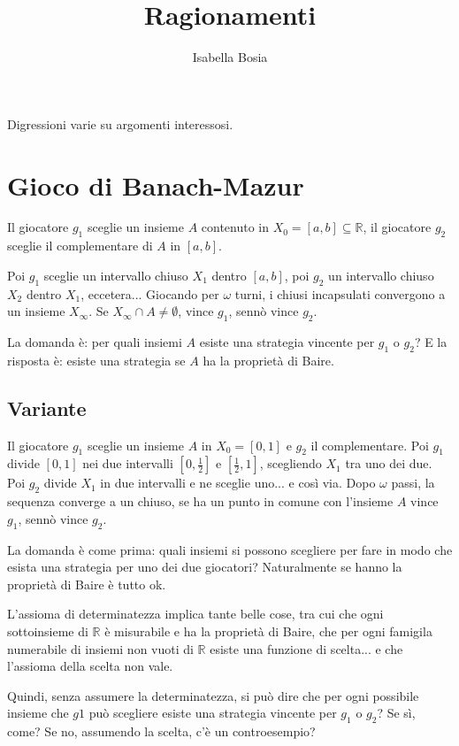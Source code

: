 \documentclass[10pt]{article}
\title{Ragionamenti}
\author{Isabella Bosia}
\date{}
\theoremstyle{definition}
\begin{document}
\maketitle

Digressioni varie su argomenti interessosi.

\section{Gioco di Banach-Mazur}

Il giocatore $g_1$ sceglie un insieme $A$ contenuto in $X_0=[a,b]\subseteq\mathbb R$, il giocatore $g_2$ sceglie il complementare di $A$ in $[a,b]$.

Poi $g_1$ sceglie un intervallo chiuso $X_1$ dentro $[a,b]$, poi $g_2$ un intervallo chiuso $X_2$ dentro $X_1$, eccetera...
Giocando per $\omega$ turni, i chiusi incapsulati convergono a un insieme $X_\infty$. Se $X_\infty\cap A\neq\emptyset$, vince $g_1$, sennò vince $g_2$.

La domanda è: per quali insiemi $A$ esiste una strategia vincente per $g_1$ o $g_2$?
E la risposta è: esiste una strategia se $A$ ha la proprietà di Baire.

\subsection{Variante}

Il giocatore $g_1$ sceglie un insieme $A$ in $X_0=[0,1]$ e $g_2$ il complementare.
Poi $g_1$ divide $[0,1]$ nei due intervalli $\left[0,\frac12\right]$ e $\left[\frac12,1\right]$, scegliendo $X_1$ tra uno dei due.
Poi $g_2$ divide $X_1$ in due intervalli e ne sceglie uno... e così via.
Dopo $\omega$ passi, la sequenza converge a un chiuso, se ha un punto in comune con l'insieme $A$ vince $g_1$, sennò vince $g_2$.

La domanda è come prima: quali insiemi si possono scegliere per fare in modo che esista una strategia per uno dei due giocatori?
Naturalmente se hanno la proprietà di Baire è tutto ok.

L'assioma di determinatezza implica tante belle cose, tra cui che ogni sottoinsieme di $\mathbb R$ è misurabile e ha la proprietà di Baire, che per ogni famigila numerabile di insiemi non vuoti di $\mathbb R$ esiste una funzione di scelta... e che l'assioma della scelta non vale.

Quindi, senza assumere la determinatezza, si può dire che per ogni possibile insieme che $g1$ può scegliere esiste una strategia vincente per $g_1$ o $g_2$?
Se sì, come? Se no, assumendo la scelta, c'è un controesempio?
\end{document}
